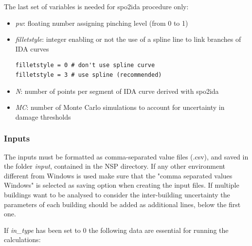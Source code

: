 The last set of variables is needed for spo2ida procedure only:

\begin{itemize}
\item \textit{pw}: floating number assigning pinching level (from 0 to 1)
\item \textit{filletstyle}: integer enabling or not the use of a spline line to link branches of IDA curves

\begin{Verbatim}[frame=single, commandchars=\\\{\}, samepage=true]
filletstyle = 0 # don't use spline curve
filletstyle = 3 # use spline (recommended)
\end{Verbatim}

\item \textit{N}: number of points per segment of IDA curve derived with spo2ida
\item \textit{MC}: number of Monte Carlo simulations to account for uncertainty in damage thresholds
\end{itemize}

\subsubsection{Inputs}
The inputs must be formatted as comma-separated value files (.csv), and saved in the folder \textit{input}, contained in the NSP directory. If any other environment different from Windows is used make sure that the "comma separated values Windows" is selected as saving option when creating the input files. If multiple buildings want to be analysed to consider the inter-building uncertainty the parameters of each building should be added as additional lines, below the first one.

If \textit{in\_type} has been set to 0 the following data are essential for running the calculations:

